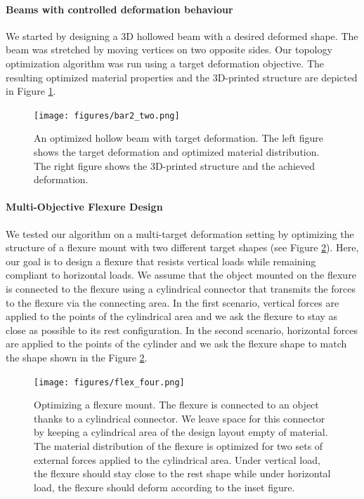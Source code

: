 		\paragraph*{Beams with controlled deformation behaviour}
		
		We started by designing a 3D hollowed beam with a desired deformed shape. The beam was stretched by moving vertices on two opposite sides. Our topology optimization algorithm was run using a target deformation objective. The resulting optimized material properties and the 3D-printed structure are depicted in Figure \ref{fig:beam}. 
		
		\begin{figure}[h!]
			\centering
			\texttt{[image: figures/bar2\_two.png]}
			\caption{
				An optimized hollow beam with target deformation. The left figure shows the target deformation and optimized material distribution. The right figure shows the 3D-printed structure and the achieved deformation.
				\label{fig:beam}}
		\end{figure}
		
		\paragraph*{Multi-Objective Flexure Design}
		We tested our algorithm on a multi-target deformation setting by optimizing the structure of a flexure mount with two different target shapes (see Figure \ref{fig:flexure}). Here, our goal is to design a flexure that resists vertical loads while remaining compliant to horizontal loads. We assume that the object mounted on the flexure is connected to the flexure using a cylindrical connector that transmits the forces to the flexure via the connecting area. In the first scenario, vertical forces are applied to the points of the cylindrical area and we ask the flexure to stay as close as possible to its rest configuration. In the second scenario, horizontal forces are applied to the points of the cylinder and we ask the flexure shape to match the shape shown in the Figure \ref{fig:flexure}. %
		\begin{figure}
			\centering
			\texttt{[image: figures/flex\_four.png]}	
			\caption{Optimizing a flexure mount. The flexure is connected to an object thanks to a cylindrical connector. We leave space for this connector by keeping a cylindrical area of the design layout empty of material. The material distribution of the flexure is optimized for two sets of external forces applied to the cylindrical area. Under vertical load, the flexure should stay close to the rest shape while under horizontal load, the flexure should deform according to the inset figure. 
				\label{fig:flexure}}
		\end{figure}
		
